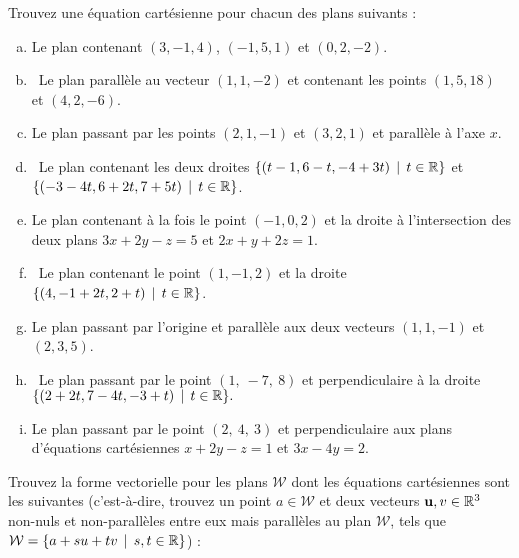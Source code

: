 \begin{prob}
\end{prob} \begin{prob} \label{prob03.6}  Trouvez une équation cartésienne pour chacun des plans suivants :

\medskip
\begin{enumerate}[a)]
\item Le plan contenant $(3, -1, 4)$, $(-1, 5, 1)$ et $(0, 2, -2)$.\medskip%
\item\sov~Le plan parallèle au vecteur $(1, 1, -2)$ et contenant les points $(1, 5, 18)$ et $(4, 2, -6)$.\medskip %
\item Le plan passant par les points $(2, 1, -1)$ et $(3, 2, 1)$ et parallèle à l'axe $x$. \medskip
\item\sov~Le plan contenant les deux droites 
$\{(t-1,6-t,-4+3t)\, \mid \, t \in \mathbb{R}\}$ et $ \{(-3 -4t, 6+ 2t, 7+5t)\, \mid \, t\in \mathbb{R}\}$.\medskip  %
\item Le plan contenant à la fois le point $(-1, 0, 2)$ et la droite à l'intersection des deux plans $3x + 2y - z = 5$ et $2x + y + 2z = 1$.  \medskip %
\item\sov~Le plan contenant le point $(1, -1, 2)$ et la droite $\{(4, -1 + 2t,2 + t)\, \mid \, t \in \mathbb{R}\}$. \medskip%
\item Le plan passant par l'origine et parallèle aux deux vecteurs $(1, 1, -1)$ et $(2, 3, 5)$. \medskip%
\item\sov~Le plan passant par le point $(1,\ -7,\ 8)$ et perpendiculaire à la droite\\ $\{(2+2t,7-4t,-3+t) \, \mid \, t\in \mathbb{R}\}.$ \smallskip  
\item Le plan passant par le point $(2,\ 4,\ 3)$ et perpendiculaire aux plans d'équations cartésiennes $x+2y-z=1$ et $3x-4y=2$.  


\end{enumerate}
 

\end{prob} \begin{prob} \label{prob03.7}   Trouvez la forme vectorielle pour les plans $\mathcal W$ dont les équations cartésiennes sont les suivantes 
(c'est-à-dire, trouvez un point $a \in \mathcal W$ et deux vecteurs $\mathbf{u}, v \in \mathbb{R}^3$ non-nuls et non-parallèles entre eux mais parallèles au plan $\mathcal W$, tels que $\mathcal W=\{a+ s u + t v\, \mid \, s,t \in \mathbb{R}\}$) :\medskip
\begin{enumerate}[a)]


\end{enumerate}
\end{prob}
